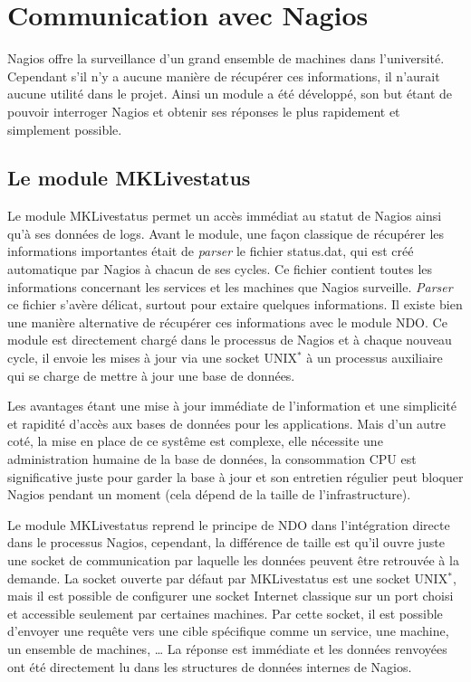 \section{Communication avec Nagios}

Nagios offre la surveillance d'un grand ensemble de machines dans l'universit\'e. 
Cependant s'il n'y a aucune mani\`ere de r\'ecup\'erer ces informations, il n'aurait aucune utilit\'e dans le projet.
Ainsi un module a \'et\'e d\'evelopp\'e, son but \'etant de pouvoir interroger Nagios et obtenir ses r\'eponses le plus rapidement et simplement possible.

\subsection{Le module MKLivestatus}
\label{section:moduleMKLivestatus}

Le module MKLivestatus permet un acc\`es imm\'ediat au statut de Nagios ainsi qu'\`a ses donn\'ees de logs.
Avant le module, une fa\c{c}on classique de r\'ecup\'erer les informations importantes \'etait de \textit{parser} le fichier \textsf{status.dat}, qui est cr\'e\'e automatique par Nagios \`a chacun de ses cycles.
Ce fichier contient toutes les informations concernant les services et les machines que Nagios surveille.
\textit{Parser} ce fichier s'av\`ere d\'elicat, surtout pour extaire quelques informations.
Il existe bien une mani\`ere alternative de r\'ecup\'erer ces informations avec le module NDO.
Ce module est directement charg\'e dans le processus de Nagios et \`a chaque nouveau cycle, il envoie les mises \`a jour via une socket UNIX$^*$ \`a un processus auxiliaire qui se charge de mettre \`a jour une base de donn\'ees.

Les avantages \'etant une mise \`a jour imm\'ediate de l'information et une simplicit\'e et rapidit\'e d'acc\`es aux bases de donn\'ees pour les applications.
Mais d'un autre cot\'e, la mise en place de ce syst\^eme est complexe, elle n\'ecessite une administration humaine de la base de donn\'ees, la consommation CPU est significative juste pour garder la base \`a jour et son entretien r\'egulier peut bloquer Nagios pendant un moment (cela d\'epend de la taille de l'infrastructure).

Le module MKLivestatus reprend le principe de NDO dans l'int\'egration directe dans le processus Nagios, cependant, la diff\'erence de taille est qu'il ouvre juste une socket de communication par laquelle les donn\'ees peuvent \^etre retrouv\'ee \`a la demande.
La socket ouverte par d\'efaut par MKLivestatus est une socket UNIX$^*$, mais il est possible de configurer une socket Internet classique sur un port choisi et accessible seulement par certaines machines.
Par cette socket, il est possible d'envoyer une requ\^ete vers une cible sp\'ecifique comme un service, une machine, un ensemble de machines, \ldots{}
La r\'eponse est imm\'ediate et les donn\'ees renvoy\'ees ont \'et\'e directement lu dans les structures de donn\'ees internes de Nagios.

